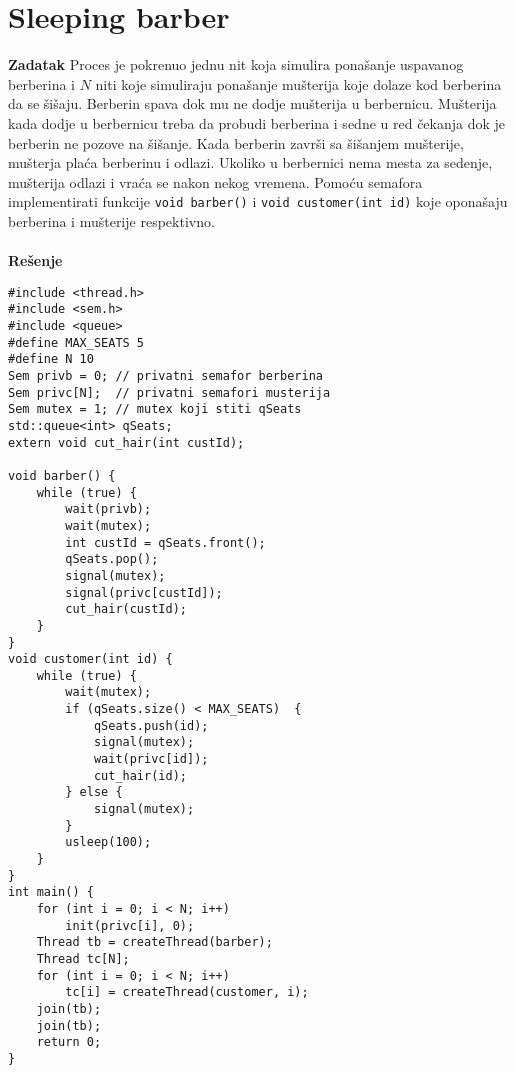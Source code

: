 \clearpage
\section{Sleeping barber}
\textbf{\large Zadatak} Proces je pokrenuo jednu nit koja simulira pona\v{s}anje uspavanog berberina i $N$ niti koje simuliraju pona\v{s}anje mu\v{s}terija koje dolaze kod berberina da se \v{s}i\v{s}aju. Berberin spava dok mu ne dodje mu\v{s}terija u berbernicu. Mu\v{s}terija kada dodje u berbernicu treba da probudi berberina i sedne u red \v{c}ekanja dok je berberin ne pozove na \v{s}i\v{s}anje. Kada berberin zavr\v{s}i sa \v{s}i\v{s}anjem mu\v{s}terije, mu\v{s}terja pla\'{c}a berberinu i odlazi. Ukoliko u berbernici nema mesta za sedenje, mu\v{s}terija odlazi i vra\'{c}a se nakon nekog vremena. Pomo\'{c}u semafora implementirati funkcije \texttt{void barber()} i \texttt{void customer(int id)} koje opona\v{s}aju berberina i mu\v{s}terije respektivno.
\\\\
\textbf{\large Re\v{s}enje}
\begin{lstlisting}
#include <thread.h>
#include <sem.h>
#include <queue>
#define MAX_SEATS 5
#define N 10
Sem privb = 0; // privatni semafor berberina
Sem privc[N];  // privatni semafori musterija
Sem mutex = 1; // mutex koji stiti qSeats
std::queue<int> qSeats;
extern void cut_hair(int custId);

void barber() {
    while (true) {
        wait(privb);
        wait(mutex);
        int custId = qSeats.front();
        qSeats.pop();
        signal(mutex);
        signal(privc[custId]);
        cut_hair(custId);
    }
}
void customer(int id) {
    while (true) {
        wait(mutex);
        if (qSeats.size() < MAX_SEATS)  {
            qSeats.push(id);
            signal(mutex);
            wait(privc[id]);
            cut_hair(id);
        } else {
            signal(mutex);
        }
        usleep(100);
    }
}
int main() {
    for (int i = 0; i < N; i++) 
        init(privc[i], 0);
    Thread tb = createThread(barber);
    Thread tc[N];
    for (int i = 0; i < N; i++) 
        tc[i] = createThread(customer, i);
    join(tb);
    join(tb);
    return 0;
}

\end{lstlisting}